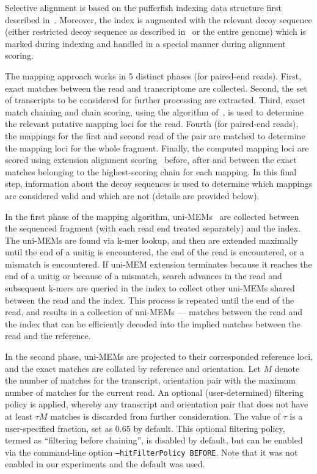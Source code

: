 Selective alignment is based on the pufferfish indexing data structure first
described in~\cite{pufferfish}. Moreover, the index is augmented with the
relevant decoy sequence (either restricted decoy sequence as described
in~ or the entire genome) which is marked during
indexing and handled in a special manner during alignment scoring.


The mapping approach works in 5 distinct phases (for paired-end reads).
First, exact matches between the read and transcriptome are collected.
Second, the set of transcripts to be considered for further processing are
extracted. Third, exact match chaining and chain scoring, using the algorithm
of~\citet{minimap2}, is used to determine the relevant putative mapping loci
for the read. Fourth (for paired-end reads), the mappings for the first and
second read of the pair are matched to determine the mapping loci for the
whole fragment. Finally, the computed mapping loci are scored using extension
alignment scoring~\citep{minimap2,suzuki2018introducing} before, after and 
between the exact matches belonging to the highest-scoring chain for each 
mapping. In this final step, information about the decoy sequences is used to
determine which mappings are considered valid and which are not (details are
provided below).

In the first phase of the mapping algorithm, uni-MEMs~\cite{debga} are
collected between the sequenced fragment (with each read end treated
separately) and the index. The uni-MEMs are found via k-mer lookup, and then
are extended maximally until the end of a unitig is encountered, the
end of the read is encountered, or a mismatch is encountered.  If uni-MEM 
extension terminates because it reaches the end of a unitig or because of a 
mismatch, search advances in the read and subsequent k-mers are queried in 
the index to collect other uni-MEMs shared between the read and the index.
This process is repeated until the end of the read, and results in a collection 
of uni-MEMs --- matches between the read and the index that can be efficiently 
decoded into the implied matches between the read and the reference.

In the second phase, uni-MEMs are projected to their corresponded reference
loci, and the exact matches are collated by reference and orientation. Let
$M$ denote the number of matches for the transcript, orientation pair with
the maximum number of matches for the current read. An optional
(user-determined) filtering policy is applied, whereby any transcript and
orientation pair that does not have at least $\tau M$ matches is
discarded from further consideration. The value of $\tau$ is a user-specified
fraction, set as $0.65$ by default.  This optional filtering policy, termed 
as ``filtering before chaining'', is disabled by default, but can be enabled 
via the command-line option \texttt{--hitFilterPolicy BEFORE}. Note that it
was not enabled in our experiments and the default was used. 

